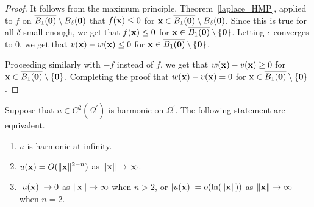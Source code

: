 \begin{proof}
It follows from the maximum principle, Theorem~\ref{laplace_HMP},
applied to $f$ on
$\displaystyle \overline{B_1(\mathbf{0})} \setminus B_\delta(\mathbf{0})$
that $f(\mathbf{x}) \leq 0$ for
$\displaystyle \mathbf{x} \in \overline{B_1(\mathbf{0})} \setminus B_\delta(\mathbf{0})$.
Since this is true for all $\delta$ small enough, we get that
$f(\mathbf{x}) \leq 0$ for
$\displaystyle \mathbf{x} \in \overline{B_1(\mathbf{0})} \setminus \{\mathbf{0}\}$.
Letting $\epsilon$ converges to $0$, we get that
$\displaystyle v(\mathbf{x}) - w(\mathbf{x}) \leq 0$ for
$\displaystyle \mathbf{x} \in \overline{B_1(\mathbf{0})} \setminus \{\mathbf{0}\}$.

Proceeding similarly with $-f$ instead of $f$, we get that
$\displaystyle w(\mathbf{x}) - v(\mathbf{x}) \geq 0$ for
$\displaystyle \mathbf{x} \in \overline{B_1(\mathbf{0})} \setminus \{\mathbf{0}\}$.
Completing the proof that
$\displaystyle w(\mathbf{x}) - v(\mathbf{x}) = 0$ for
$\displaystyle \mathbf{x} \in \overline{B_1(\mathbf{0})} \setminus \{\mathbf{0}\}$.
\end{proof}

\begin{prop} \label{pot_infty_u}
Suppose that $\displaystyle u\in C^2(\Omega^{\prime})$ is harmonic on
$\displaystyle \Omega^{\prime}$.
The following statement are equivalent.
\begin{enumerate}
\item $u$ is harmonic at infinity.
\item $\displaystyle u(\mathbf{x}) = O(\|\mathbf{x}\|^{2-n})$ as
$\|\mathbf{x}\| \rightarrow \infty$.
\item $|u(\mathbf{x})| \to 0 $ as $\|\mathbf{x}\| \rightarrow \infty$
when $n>2$, or
$|u(\mathbf{x})| = o(\ln(\|\mathbf{x}\|))$ as $\|\mathbf{x}\| \rightarrow \infty$
when $n=2$.
\end{enumerate}
\end{prop}


